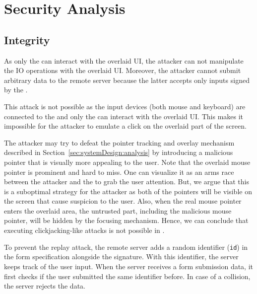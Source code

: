 \section{Security Analysis}
\label{sec:securityAnalysis}




\subsection{Integrity}
\label{sec:securityAnalysis:integrity}



 As only the \device can interact with the overlaid UI, the attacker can not manipulate the IO operations with the overlaid UI. Moreover, the attacker cannot submit arbitrary data to the remote server because the latter accepts only inputs signed by the \device.

 This attack is not possible as the input devices (both mouse and keyboard) are connected to the \device and only the \device can interact with the overlaid UI. This makes it impossible for the attacker to emulate a click on the overlaid part of the screen.  

The attacker may try to defeat the \name pointer tracking and overlay mechanism described in Section~\ref{sec:systemDesign:analysis} by introducing a malicious pointer that is visually more appealing to the user. Note that the \device overlaid mouse pointer is prominent and hard to miss. One can visualize it as an arms race between the attacker and the \device to grab the user attention. But, we argue that this is a suboptimal strategy for the attacker as both of the pointers will be visible on the screen that cause suspicion to the user. Also, when the real mouse pointer enters the overlaid area, the untrusted part, including the malicious mouse pointer, will be hidden by the focusing mechanism. Hence, we can conclude that executing clickjacking-like attacks is not possible in \name.

To prevent the replay attack, the remote server adds a random identifier (\texttt{id}) in the form specification alongside the signature. With this identifier, the server keeps track of the user input. When the server receives a form submission data, it first checks if the user submitted the same identifier before. In case of a collision, the server rejects the data. 

